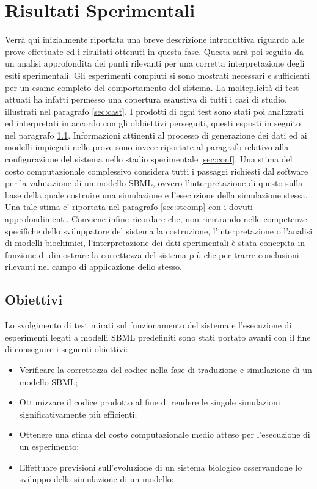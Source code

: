 \documentclass[Lau, oneside]{sapthesis}
\begin{document}
\chapter{Risultati Sperimentali}
Verrà qui inizialmente riportata una breve descrizione introduttiva riguardo alle prove effettuate ed i risultati ottenuti in questa fase. Questa sarà poi seguita da un analisi approfondita dei punti rilevanti per una corretta interpretazione degli esiti sperimentali.
Gli esperimenti compiuti si sono mostrati necessari e sufficienti per un esame completo del comportamento del sistema. La molteplicità di test attuati ha infatti permesso una copertura esaustiva di tutti i casi di studio, illustrati nel paragrafo \ref{sec:cast}. I prodotti di ogni test sono stati poi analizzati ed interpretati in accordo con gli obbiettivi perseguiti, questi esposti in seguito nel paragrafo \ref{sec:obi}.
Informazioni attinenti al processo di generazione dei dati ed ai modelli impiegati nelle prove sono invece riportate al paragrafo relativo alla configurazione del sistema nello stadio sperimentale \ref{sec:conf}.
Una stima del costo computazionale complessivo considera tutti i passaggi richiesti dal software per la valutazione di un modello SBML, ovvero l'interpretazione di questo sulla base della quale costruire una simulazione e l'esecuzione della simulazione stessa. Una tale stima e' riportata nel paragrafo \ref{sec:stcomp} con i dovuti approfondimenti.
Conviene infine ricordare che, non rientrando nelle competenze specifiche dello sviluppatore del sistema la costruzione, l'interpretazione o l’analisi di modelli biochimici, l'interpretazione dei dati sperimentali \`e stata concepita in funzione di dimostrare la correttezza del sistema più che per trarre conclusioni rilevanti nel campo di applicazione dello stesso.

\newpage
\section{Obiettivi}
\label{sec:obi}
Lo svolgimento di test mirati sul funzionamento del sistema e l'esecuzione di esperimenti legati a modelli SBML predefiniti sono stati portato avanti con il fine di conseguire i seguenti obiettivi:
\begin{itemize}
    \item Verificare la correttezza del codice nella fase di traduzione e simulazione di un modello SBML;
    \item Ottimizzare il codice prodotto al fine di rendere le singole simulazioni significativamente più efficienti;
    \item Ottenere una stima del costo computazionale medio atteso per l'esecuzione di un esperimento;
    \item Effettuare previsioni sull'evoluzione di un sistema biologico osservandone lo sviluppo della simulazione di un modello;
\end{itemize}
\end{document}
